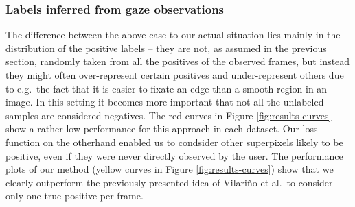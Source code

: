 \subsubsection{Labels inferred from gaze observations}
The difference between the above case to our actual situation lies mainly in the distribution of the positive labels -- they are not, as assumed in the previous section, randomly taken from all the positives of the observed frames, but instead they might often over-represent certain positives and under-represent others due to e.g.\ the fact that it is easier to fixate an edge than a smooth region in an image. 
In this setting it becomes more important that not all the unlabeled samples are considered negatives. 
The red curves in Figure \ref{fig:results-curves} show a rather low performance for this approach in each dataset. 
Our loss function on the otherhand enabled us to condsider other superpixels likely to be positive, even if they were never directly observed by the user. 
The performance plots of our method (yellow curves in Figure \ref{fig:results-curves}) show that we clearly outperform the previously presented idea of Vilari\~no et al.\ to consider only one true positive per frame.


